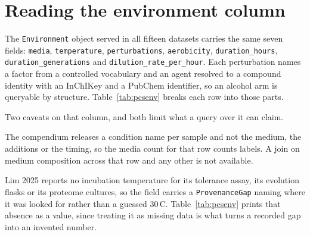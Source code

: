 
\section{Reading the environment column}\label{sec:environment}

The \texttt{Environment} object served in all fifteen datasets carries the same seven
fields: \texttt{media}, \texttt{temperature}, \texttt{perturbations},
\texttt{aerobicity}, \texttt{duration\_hours}, \texttt{duration\_generations} and
\texttt{dilution\_rate\_per\_hour}. Each perturbation names a factor from a controlled
vocabulary and an agent resolved to a compound identity with an InChIKey and a PubChem
identifier, so an alcohol arm is queryable by structure. Table~\ref{tab:pcsenv} breaks
each row into those parts.

Two caveats on that column, and both limit what a query over it can claim.

 The compendium releases a
condition name per sample and not the medium, the additions or the timing, so the media
count for that row counts labels. A join on medium composition across that row and any
other is not available.

 Lim 2025 reports no incubation
temperature for its tolerance assay, its evolution flasks or its proteome cultures, so
the field carries a \texttt{ProvenanceGap} naming where it was looked for rather than a
guessed 30\,\textdegree C. Table~\ref{tab:pcsenv} prints that absence as a value, since
treating it as missing data is what turns a recorded gap into an invented number.

\clearpage

